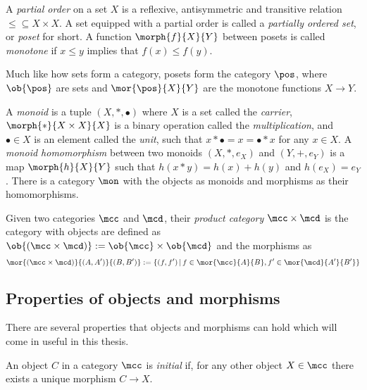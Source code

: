 \begin{example}[Posets]
    A \emph{partial order} on a set \(X\) is a reflexive, antisymmetric and
    transitive relation \(\leq \subseteq X \times X\).
    A set equipped with a partial order is called a
    \emph{partially ordered set}, or \emph{poset} for short.
    A function \(\morph{f}{X}{Y}\) between posets is called \emph{monotone} if
    \(x \leq y\) implies that \(f(x) \leq f(y)\).

    Much like how sets form a category, posets form the category \(\pos\), where
    \(\ob{\pos}\) are sets and \(\mor{\pos}{X}{Y}\) are the monotone functions
    \(X \to Y\).
\end{example}

\begin{example}[Monoids]
    A \emph{monoid} is a tuple \((X, *, \bullet)\) where \(X\) is a set called
    the \emph{carrier}, \(\morph{*}{X \times X}{X}\) is a binary operation
    called the \emph{multiplication}, and \(\bullet \in X\) is an element called
    the \emph{unit}, such that \(x * \bullet = x = \bullet * x\) for any
    \(x \in X\).
    A \emph{monoid homomorphism} between two monoids \((X, *, e_X)\) and
    \((Y, +, e_Y)\) is a map \(\morph{h}{X}{Y}\) such that
    \(h(x * y) = h(x) + h(y)\) and \(h(e_X) = e_Y\).
    There is a category \(\mon\) with the objects as monoids and morphisms as
    their homomorphisms.
\end{example}

\begin{example}
    Given two categories \(\mcc\) and \(\mcd\), their \emph{product category}
    \(\mcc \times \mcd\) is the category with objects are defined as \(
        \ob{(\mcc \times \mcd)} := \ob{\mcc} \times \ob{\mcd}
    \) and the morphisms as \[
        \mor{(\mcc \times \mcd)}{(A, A^\prime)}{(B, B^\prime)}
        :=
        \{
            (f, f^\prime)
            \,|\,
            f \in \mor{\mcc}{A}{B},
            f^\prime \in \mor{\mcd}{A^\prime}{B^\prime}
        \}
    \]
\end{example}

\subsection{Properties of objects and morphisms}

There are several properties that objects and morphisms can hold which will come
in useful in this thesis.

\begin{definition}
    An object \(C\) in a category \(\mcc\) is \emph{initial} if, for any other
    object \(X \in \mcc\) there exists a unique morphism \(C \to X\).
\end{definition}

